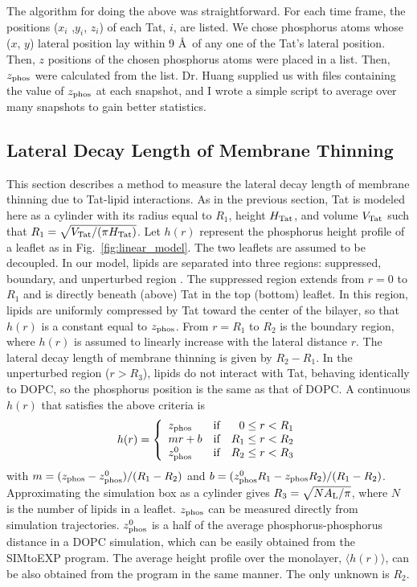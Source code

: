 The algorithm for doing the above was straightforward.  
For each time frame, the positions ($x_i$ ,$y_i$, $z_i$) of each Tat, $i$, are 
listed.   
We chose phosphorus atoms whose ($x$, $y$) lateral position lay within 
9 \AA\ of any one of the Tat's lateral position. Then, $z$ positions
of the chosen phosphorus atoms were placed in a list. 
Then, $z_\textrm{phos}$ were calculated from the list. 
Dr. Huang supplied us with files containing the value of $z_\textrm{phos}$ 
at each snapshot, and I wrote a simple script to average over many snapshots 
to gain better statistics. 

\subsection{Lateral Decay Length of Membrane Thinning}\label{sec:lateral_decay}
This section describes a method to measure the lateral decay length
of membrane thinning due to Tat-lipid interactions. 
As in the previous section, Tat is modeled here as a cylinder with 
its radius equal to $R_1$, height $H_\textrm{Tat}$,
and volume $V_\textrm{Tat}$ such that $R_1=\sqrt{V_\textrm{Tat}/(\pi H_\textrm{Tat})}$. 
Let $h(r)$ represent the phosphorus height profile
of a leaflet as in Fig.~\ref{fig:linear_model}. The two leaflets are assumed to be decoupled.
In our model, lipids are separated into three regions: 
suppressed, boundary, and unperturbed region . 
The suppressed region extends from $r=0$ to $R_1$ and is directly beneath 
(above) Tat in the top (bottom) leaflet. In this region, lipids are uniformly 
compressed by Tat toward the 
center of the bilayer, so that $h(r)$ is a constant equal to $z_\textrm{phos}$. 
From $r=R_1$ to $R_2$ is the boundary region, where $h(r)$ is assumed to 
linearly increase with the lateral distance $r$. The lateral decay length
of membrane thinning is given by $R_2-R_1$. 
In the unperturbed region ($r>R_3$), lipids do not interact with 
Tat, behaving identically to DOPC, so the phosphorus position is the same as that of 
DOPC. A continuous $h(r)$ that 
satisfies the above criteria is
\begin{equation}
  h(r) = \left\{ 
  \begin{array}{lcr}
    z_\textrm{phos}   & \text{if} & 0   \leq r < R_1 \\
    mr+b     & \text{if} & R_1 \leq r < R_2 \\
    z_\textrm{phos}^0 & \text{if} & R_2 \leq r < R_3 
  \end{array}\right.  
\end{equation}     
with $m=(z_\textrm{phos}-z_\textrm{phos}^0)/(R_1-R_2)$ and $b=(z_\textrm{phos}^0R_1-z_\textrm{phos} R_2)/(R_1-R_2)$. 
Approximating the simulation box as a cylinder gives 
$R_3=\sqrt{NA_\textrm{L}/\pi}$, where $N$ is the number of lipids in a leaflet. 
$z_\textrm{phos}$ can be measured directly from simulation trajectories.
$z_\textrm{phos}^0$ is a half of the average phosphorus-phosphorus distance 
in a DOPC simulation,
which can be easily obtained from the SIMtoEXP program. 
The average height profile over
the monolayer, $\langle h(r) \rangle$, can be also obtained from the program 
in the same manner. 
The only unknown is $R_2$.

